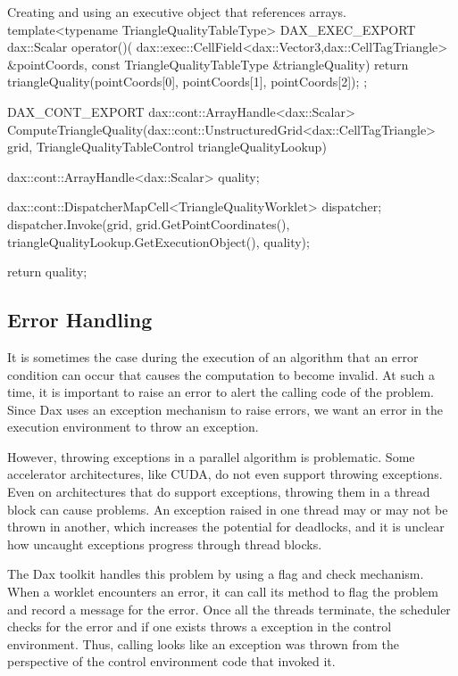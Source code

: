 \begin{daxexample}{Creating and using an executive object that references arrays.}
{  template<typename TriangleQualityTableType>
  DAX_EXEC_EXPORT
  dax::Scalar operator()(
      dax::exec::CellField<dax::Vector3,dax::CellTagTriangle> &pointCoords,
      const TriangleQualityTableType &triangleQuality)
  {
    return triangleQuality(pointCoords[0], pointCoords[1], pointCoords[2]);
  }
};

DAX_CONT_EXPORT
dax::cont::ArrayHandle<dax::Scalar>
ComputeTriangleQuality(dax::cont::UnstructuredGrid<dax::CellTagTriangle> grid,
                       TriangleQualityTableControl triangleQualityLookup)
{
  dax::cont::ArrayHandle<dax::Scalar> quality;

  dax::cont::DispatcherMapCell<TriangleQualityWorklet> dispatcher;
  dispatcher.Invoke(grid,
                    grid.GetPointCoordinates(),
                    triangleQualityLookup.GetExecutionObject(),
                    quality);

  return quality;
}
\end{daxexample}



\subsection{Error Handling}
\label{sec:ErrorHandlingExecution}


It is sometimes the case during the execution of an algorithm that an error
condition can occur that causes the computation to become invalid. At such
a time, it is important to raise an error to alert the calling code of the
problem. Since Dax uses an exception mechanism to raise errors, we want an
error in the execution environment to throw an exception.

However, throwing exceptions in a parallel algorithm is problematic. Some
accelerator architectures, like CUDA, do not even support throwing
exceptions. Even on architectures that do support exceptions, throwing them
in a thread block can cause problems. An exception raised in one thread may
or may not be thrown in another, which increases the potential for
deadlocks, and it is unclear how uncaught exceptions progress through
thread blocks.

The Dax toolkit handles this problem by using a flag and check
mechanism. When a worklet encounters an error, it can call its
 method to flag the problem and record a message for
the error. Once all the threads terminate, the scheduler checks for the
error and if one exists throws a  exception in the
control environment. Thus, calling  looks like an
exception was thrown from the perspective of the control environment code
that invoked it.

